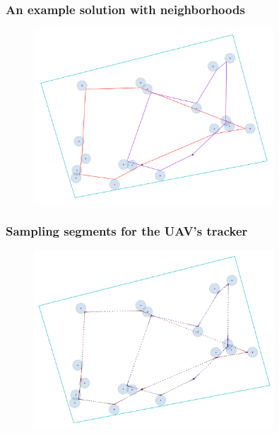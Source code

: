 \documentclass[aspectratio=1610]{beamer}
\begin{document}
  \begin{frame}
    \frametitle{An example solution with neighborhoods}

    \begin{figure}
      \includegraphics[width=0.8\textwidth]{fig/mtspn_task/tsp_segments.png}
    \end{figure}

  \end{frame}

  \begin{frame}
    \frametitle{Sampling segments for the UAV's tracker}

    \begin{figure}
      \includegraphics[width=0.8\textwidth]{fig/mtspn_task/tsp_segments_sampled.png}
    \end{figure}

  \end{frame}
\end{document}

